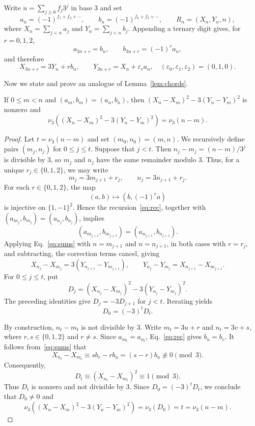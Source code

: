 \documentclass[12pt,reqno]{article}
\newcommand{\vp}{\nu_3}
\begin{document}
Write $n=\sum_{j\ge0}f_j 3^j$ in base $3$ and set
\[
 a_n=(-1)^{f_1+f_3+\cdots},\qquad
 b_n=(-1)^{f_0+f_2+\cdots},\qquad
 R_n=(X_n,Y_n,n),
\]
where $X_n=\sum_{j<n}a_j$ and $Y_n=\sum_{j<n}b_j$. Appending a ternary
digit gives, for $r=0,1,2$,
\begin{equation}\label{eq:rec}
 a_{3n+r}=b_n,\qquad b_{3n+r}=(-1)^r a_n,
\end{equation}
and therefore
\begin{equation}\label{eq:sums}
 X_{3n+r}=3Y_n+r b_n,\qquad
 Y_{3n+r}=X_n+\varepsilon_r a_n,
 \quad(\varepsilon_0,\varepsilon_1,\varepsilon_2)=(0,1,0).
\end{equation}

Now we state and prove an analogue of Lemma~\ref{lem:chords}.

\begin{lemma}\label{lem:ternary-chords}
If $0\leq m<n$ and $(a_m,b_m)=(a_n,b_n)$, then
$(X_n-X_m)^2-3(Y_n-Y_m)^2$ is nonzero and
\begin{equation}\label{eq:val}
 \vp\!\left((X_n-X_m)^2-3(Y_n-Y_m)^2\right)=\vp(n-m).
\end{equation}
\end{lemma}

\begin{proof}
Let $t=\vp(n-m)$ and set $(m_0,n_0)=(m,n)$.  We recursively
define pairs $(m_j,n_j)$ for $0\leq j\leq t$.  Suppose that $j<t$.
Then $n_j-m_j=(n-m)/3^j$ is divisible by $3$, so $m_j$ and $n_j$ have the
same remainder modulo $3$.  Thus, for a unique $r_j\in\{0,1,2\}$,
we may write
\[
 m_j=3m_{j+1}+r_j,
 \qquad
 n_j=3n_{j+1}+r_j.
\]
For each $r\in\{0,1,2\}$, the map
\[
 (a,b)\longmapsto (b,(-1)^r a)
\]
is injective on $\{1,-1\}^2$.  Hence the recursion~\eqref{eq:rec},
together with $(a_{m_j},b_{m_j})=(a_{n_j},b_{n_j})$, implies
\[
 (a_{m_{j+1}},b_{m_{j+1}})
   =(a_{n_{j+1}},b_{n_{j+1}}).
\]
Applying Eq.~\eqref{eq:sums} with $n=m_{j+1}$ and
$n=n_{j+1}$, in both cases with $r=r_j$, and subtracting,
the correction terms cancel, giving
\[
 X_{n_j}-X_{m_j}=3(Y_{n_{j+1}}-Y_{m_{j+1}}),
 \qquad
 Y_{n_j}-Y_{m_j}=X_{n_{j+1}}-X_{m_{j+1}}.
\]
For $0\leq j\leq t$, put
\[
 D_j=(X_{n_j}-X_{m_j})^2-3(Y_{n_j}-Y_{m_j})^2.
\]
The preceding identities give $D_j=-3D_{j+1}$ for $j<t$.
Iterating yields
\[
 D_0=(-3)^tD_t.
\]

By construction, $n_t-m_t$ is not divisible by $3$.  Write
$m_t=3u+r$ and $n_t=3v+s$, where $r,s\in\{0,1,2\}$ and $r\ne s$.
Since $a_{m_t}=a_{n_t}$,  Eq.~\eqref{eq:rec} gives $b_u=b_v$.
It follows from~\eqref{eq:sums} that
\[
 X_{n_t}-X_{m_t}
   \equiv s b_v-r b_u
   =(s-r)b_u\not\equiv0\pmod3.
\]
Consequently,
\[
 D_t\equiv (X_{n_t}-X_{m_t})^2\equiv1\pmod3.
\]
Thus $D_t$ is nonzero and not divisible by $3$.  Since
$D_0=(-3)^tD_t$, we conclude that $D_0\ne0$ and
\[
 \vp\!\left((X_n-X_m)^2-3(Y_n-Y_m)^2\right)
   =\vp(D_0)=t=\vp(n-m).
\]
\end{proof}
\end{document}
